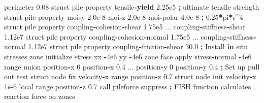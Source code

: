 \documentclass[a4paper, nobind]{templates/ociamthesis}
\newenvironment{Shaded}{\begin{snugshade}}{\end{snugshade}}
\newcommand{\BuiltInTok}[1]{#1}
\newcommand{\ControlFlowTok}[1]{\textcolor[rgb]{0.13,0.29,0.53}{\textbf{#1}}}
\newcommand{\DecValTok}[1]{\textcolor[rgb]{0.00,0.00,0.81}{#1}}
\newcommand{\FloatTok}[1]{\textcolor[rgb]{0.00,0.00,0.81}{#1}}
\newcommand{\KeywordTok}[1]{\textcolor[rgb]{0.13,0.29,0.53}{\textbf{#1}}}
\newcommand{\NormalTok}[1]{#1}
\newcommand{\OperatorTok}[1]{\textcolor[rgb]{0.81,0.36,0.00}{\textbf{#1}}}
\newcommand{\StringTok}[1]{\textcolor[rgb]{0.31,0.60,0.02}{#1}}
\renewenvironment{Shaded}
{
  \vspace{10pt}%
  \begin{snugshade}%
}{%
  \end{snugshade}%
  \vspace{8pt}%
}
\begin{document}
\begin{Shaded}
\begin{Highlighting}[]
\NormalTok{                         perimeter }\FloatTok{0.08}
\NormalTok{    struct pile }\BuiltInTok{property}\NormalTok{ tensile}\OperatorTok{{-}}\ControlFlowTok{yield}   \FloatTok{2.25e5}  \OperatorTok{;}\NormalTok{ ultimate tensile strength}
\NormalTok{    struct pile }\BuiltInTok{property}\NormalTok{ moi}\OperatorTok{{-}}\NormalTok{y }\FloatTok{2.0e{-}8}\NormalTok{ moi}\OperatorTok{{-}}\NormalTok{z }\FloatTok{2.0e{-}8}\NormalTok{ moi}\OperatorTok{{-}}\NormalTok{polar }\FloatTok{4.0e{-}8} \OperatorTok{;} \FloatTok{0.25}\OperatorTok{*}\NormalTok{pi}\OperatorTok{*}\NormalTok{r}\OperatorTok{\^{}}\DecValTok{4}
\NormalTok{    struct pile }\BuiltInTok{property}\NormalTok{ coupling}\OperatorTok{{-}}\NormalTok{cohesion}\OperatorTok{{-}}\NormalTok{shear }\FloatTok{1.75e5}\NormalTok{ ...}
\NormalTok{                         coupling}\OperatorTok{{-}}\NormalTok{stiffness}\OperatorTok{{-}}\NormalTok{shear }\FloatTok{1.12e7}
\NormalTok{    struct pile }\BuiltInTok{property}\NormalTok{ coupling}\OperatorTok{{-}}\NormalTok{cohesion}\OperatorTok{{-}}\NormalTok{normal }\FloatTok{1.75e5}\NormalTok{ ...}
\NormalTok{                         coupling}\OperatorTok{{-}}\NormalTok{stiffness}\OperatorTok{{-}}\NormalTok{normal }\FloatTok{1.12e7}
\NormalTok{    struct pile }\BuiltInTok{property}\NormalTok{ coupling}\OperatorTok{{-}}\NormalTok{friction}\OperatorTok{{-}}\NormalTok{shear }\FloatTok{30.0}
    \OperatorTok{;}\NormalTok{ Install }\KeywordTok{in}\NormalTok{ situ stresses}
\NormalTok{    zone initialize stress xx }\OperatorTok{{-}}\FloatTok{4e6}\NormalTok{ yy }\OperatorTok{{-}}\FloatTok{4e6}
\NormalTok{    zone face }\BuiltInTok{apply}\NormalTok{ stress}\OperatorTok{{-}}\NormalTok{normal }\OperatorTok{{-}}\FloatTok{4e6} \BuiltInTok{range}\NormalTok{ union position}\OperatorTok{{-}}\NormalTok{x }\DecValTok{0}\NormalTok{ position}\OperatorTok{{-}}\NormalTok{x }\FloatTok{0.4}\NormalTok{ ...}
\NormalTok{                                                   position}\OperatorTok{{-}}\NormalTok{y }\DecValTok{0}\NormalTok{ position}\OperatorTok{{-}}\NormalTok{y }\FloatTok{0.4}
    \OperatorTok{;}\NormalTok{ Set up pull out test}
\NormalTok{    struct node fix velocity}\OperatorTok{{-}}\NormalTok{x }\BuiltInTok{range}\NormalTok{ position}\OperatorTok{{-}}\NormalTok{z }\FloatTok{0.7}
\NormalTok{    struct node init velocity}\OperatorTok{{-}}\NormalTok{x }\FloatTok{1e{-}6}\NormalTok{ local }\BuiltInTok{range}\NormalTok{ position}\OperatorTok{{-}}\NormalTok{z }\FloatTok{0.7}
\NormalTok{    call }\StringTok{\textquotesingle{}pileforce\textquotesingle{}}\NormalTok{ suppress }\OperatorTok{;}\NormalTok{ FISH function calculates reaction force on zones}

\end{Highlighting}
\end{Shaded}
\end{document}
